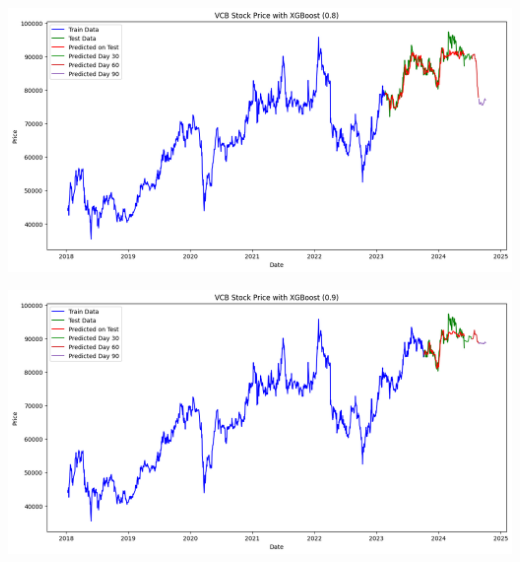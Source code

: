 \documentclass[conference]{IEEEtran}
\begin{document}
\begin{minipage}{0.21\textwidth}
    \centering
    \includegraphics[width=\linewidth]{images/XGBoost/XGBoost_VCB_82.png}
    \label{fig:image1}
\end{minipage}
\hfill
\begin{minipage}{0.21\textwidth}
    \centering
    \includegraphics[width=\linewidth]{images/XGBoost/XGBoost_VCB_91.png}
    \label{fig:image2}
\end{minipage}
\end{document}
